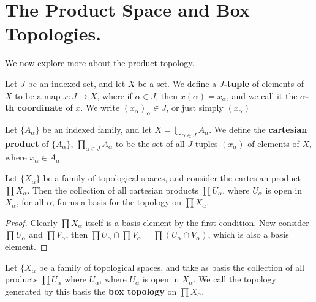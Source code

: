 
\section{The Product Space and Box Topologies.}

We now explore more about the product topology.

\begin{definition}
    Let $J$ be an indexed set, and let  $X$ be a set. We define a  \textbf{$J$-tuple} of elements of
    $X$ to be a map $x:J \rightarrow X$, where if  $\alpha \in J$, then  $x(\alpha)=x_{\alpha}$, and
    we call it the \textbf{$\alpha$-th coordinate} of $x$. We write  $(x_{\alpha})_\alpha \in J$, or
just simply $(x_{\alpha})$
\end{definition}

\begin{definition}
Let $\{A_{\alpha}\}$ be an indexed family, and let $X=\bigcup_{\alpha \in J}{A_{\alpha}}$. We define
the \textbf{cartesian product} of $\{A_{\alpha}\}$, $\prod_{\alpha \in J}{A_\alpha}$ to be the set of
all $J$-tuples  $(x_{\alpha})$ of elements of $X$, where  $x_{\alpha} \in A_{\alpha}$
\end{definition}

\begin{theorem}\label{2.1.1}
    Let $\{X_{\alpha}\}$ be a family of topological spaces, and consider the cartesian product
    $\prod{X_{\alpha}}$. Then the collection of all cartesian products $\prod{U_{\alpha}}$, where
    $U_{\alpha}$ is open in $X_{\alpha}$, for all $\alpha$, forms a basis for the topology on
    $\prod{X_{\alpha}}$.
\end{theorem}
\begin{proof}
    Clearly $\prod{X_{\alpha}}$ itself is a basis element by the first condition. Now consider
    $\prod{U_{\alpha}}$ and $\prod{V_{\alpha}}$, then $\prod{U_{\alpha}} \cap
    \prod{V_{\alpha}}=\prod{(U_{\alpha} \cap V_{\alpha})}$, which is also a basis
    element.
\end{proof}

\begin{definition}
Let $\{X_{\alpha}$ be a family of topological spaces, and take as basis the collection of all
    products $\prod{U_{\alpha}}$ where $U_{\alpha}$, where $U_{\alpha}$ is open in $X_{\alpha}$.
    We call the topology generated by this basis the \textbf{box topology} on $\prod{X_{\alpha}}$.
\end{definition}

